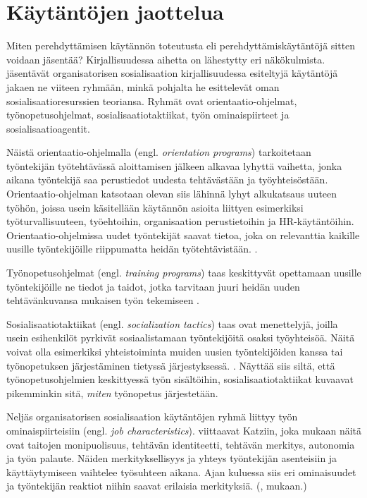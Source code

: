 \documentclass[utf8]{gradu3}
\begin{document}
\section{Käytäntöjen jaottelua}

Miten perehdyttämisen käytännön toteutusta eli perehdyttämiskäytäntöjä sitten voidaan jäsentää? Kirjallisuudessa aihetta on lähestytty eri näkökulmista. \textcite{saks-gruman-2012} jäsentävät organisatorisen sosialisaation kirjallisuudessa esiteltyjä käytäntöjä jakaen ne viiteen ryhmään, minkä pohjalta he esittelevät oman sosialisaatioresurssien teoriansa. Ryhmät ovat orientaatio-ohjelmat, työnopetusohjelmat, sosialisaatiotaktiikat, työn ominaispiirteet ja sosialisaatioagentit.

Näistä orientaatio-ohjelmalla (engl. \textit{orientation programs}) tarkoitetaan työntekijän työtehtävässä aloittamisen jälkeen alkavaa lyhyttä vaihetta, jonka aikana työntekijä saa perustiedot uudesta tehtävästään ja työyhteisöstään. Orientaatio-ohjelman katsotaan olevan siis lähinnä lyhyt alkukatsaus uuteen työhön, joissa usein käsitellään käytännön asioita liittyen esimerkiksi työturvallisuuteen, työehtoihin, organisaation perustietoihin ja HR-käytäntöihin. Orientaatio-ohjelmissa uudet työntekijät saavat tietoa, joka on relevanttia kaikille uusille työntekijöille riippumatta heidän työtehtävistään. \parencite{saks-gruman-2012}.

Työnopetusohjelmat (engl. \textit{training programs}) taas keskittyvät opettamaan uusille työntekijöille ne tiedot ja taidot, jotka tarvitaan juuri heidän uuden tehtävänkuvansa mukaisen työn tekemiseen \parencite{saks-gruman-2012}.

Sosialisaatiotaktiikat (engl. \textit{socialization tactics}) taas ovat menettelyjä, joilla usein esihenkilöt pyrkivät sosiaalistamaan työntekijöitä osaksi työyhteisöä. Näitä voivat olla esimerkiksi yhteistoiminta muiden uusien työntekijöiden kanssa tai työnopetuksen järjestäminen tietyssä järjestyksessä. \parencite{saks-gruman-2012}. Näyttää siis siltä, että työnopetusohjelmien keskittyessä työn sisältöihin, sosialisaatiotaktiikat kuvaavat pikemminkin sitä, \textit{miten} työnopetus järjestetään.

Neljäs organisatorisen sosialisaation käytäntöjen ryhmä liittyy työn ominaispiirteisiin (engl. \textit{job characteristics}). \textcite{saks-gruman-2012} viittaavat Katziin, joka mukaan näitä ovat taitojen monipuolisuus, tehtävän identiteetti, tehtävän merkitys, autonomia ja työn palaute. Näiden merkityksellisyys ja yhteys työntekijän asenteisiin ja käyttäytymiseen vaihtelee työsuhteen aikana. Ajan kuluessa siis eri ominaisuudet ja työntekijän reaktiot niihin saavat erilaisia merkityksiä. (\textcite{katz-1980}, \textcite{saks-gruman-2012} mukaan.)
\end{document}
